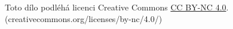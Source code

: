 \documentclass[10pt,a4paper]{article}
\date{\today}
\author{Jakub Rádl}
\makeatletter
\let\thetitle\@title
\makeatother
\begin{document}
\maketitle
\tableofcontents
\begin{figure}[b]
Toto dílo \textit{\thetitle} podléhá licenci Creative Commons \href{https://creativecommons.org/licenses/by-nc/4.0/}{CC BY-NC 4.0}.\\ (creativecommons.org/licenses/by-nc/4.0/)
\end{figure}
\newpage
\end{document}
